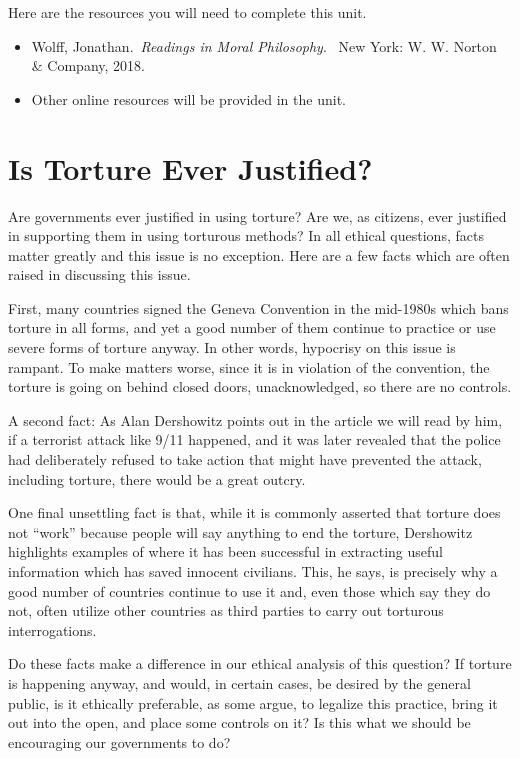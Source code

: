 \documentclass[
]{book}
\providecommand{\tightlist}{%
  \setlength{\itemsep}{0pt}\setlength{\parskip}{0pt}}
\begin{document}
Here are the resources you will need to complete this unit.

\begin{itemize}
\tightlist
\item
  Wolff, Jonathan.~\emph{Readings in Moral Philosophy}. ~New York: W. W. Norton \& Company, 2018.\\
\item
  Other online resources will be provided in the unit.
\end{itemize}

\hypertarget{is-torture-ever-justified}{%
\section*{Is Torture Ever Justified?}\label{is-torture-ever-justified}}

Are governments ever justified in using torture? Are we, as citizens, ever justified in supporting them in using torturous methods? In all ethical questions, facts matter greatly and this issue is no exception. Here are a few facts which are often raised in discussing this issue.

First, many countries signed the Geneva Convention in the mid-1980s which bans torture in all forms, and yet a good number of them continue to practice or use severe forms of torture anyway. In other words, hypocrisy on this issue is rampant. To make matters worse, since it is in violation of the convention, the torture is going on behind closed doors, unacknowledged, so there are no controls.

A second fact: As Alan Dershowitz points out in the article we will read by him, if a terrorist attack like 9/11 happened, and it was later revealed that the police had deliberately refused to take action that might have prevented the attack, including torture, there would be a great outcry.

One final unsettling fact is that, while it is commonly asserted that torture does not ``work'' because people will say anything to end the torture, Dershowitz highlights examples of where it has been successful in extracting useful information which has saved innocent civilians. This, he says, is precisely why a good number of countries continue to use it and, even those which say they do not, often utilize other countries as third parties to carry out torturous interrogations.

Do these facts make a difference in our ethical analysis of this question? If torture is happening anyway, and would, in certain cases, be desired by the general public, is it ethically preferable, as some argue, to legalize this practice, bring it out into the open, and place some controls on it? Is this what we should be encouraging our governments to do?
\end{document}
